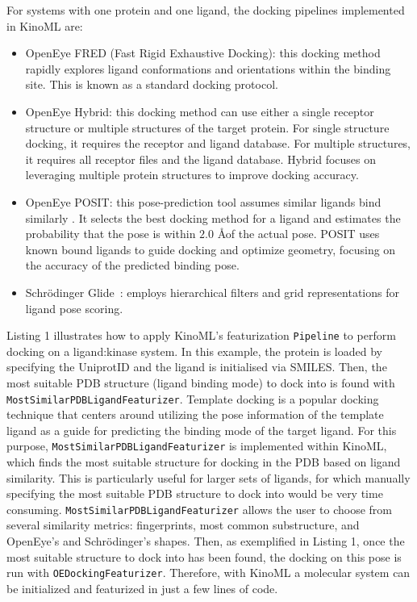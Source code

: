 \documentclass[9pt,lessons]{livecoms}
\begin{document}
For systems with one protein and one ligand, the docking pipelines implemented in KinoML are: 
\begin{itemize}
    \item OpenEye FRED (Fast Rigid Exhaustive Docking): this docking method rapidly explores ligand conformations and orientations within the binding site. This is known as a standard docking protocol.
    \item OpenEye Hybrid: this docking method can use either a single receptor structure or multiple structures of the target protein. For single structure docking, it requires the receptor and ligand database. For multiple structures, it requires all receptor files and the ligand database. Hybrid focuses on leveraging multiple protein structures to improve docking accuracy.
    \item OpenEye POSIT: this pose-prediction tool assumes similar ligands bind similarly \cite{posit}. It selects the best docking method for a ligand and estimates the probability that the pose is within $2.0$ \AA \space of the actual pose. POSIT uses known bound ligands to guide docking and optimize geometry, focusing on the accuracy of the predicted binding pose.
    \item Schrödinger Glide~\cite{friesner2006extra}: employs hierarchical filters and grid representations for ligand pose scoring.
\end{itemize}


Listing 1 illustrates how to apply KinoML's featurization \texttt{Pipeline} to perform docking on a ligand:kinase system. In this example, the protein is loaded by specifying the UniprotID and the ligand is initialised via SMILES. Then, the most suitable PDB structure (ligand binding mode) to dock into is found with \texttt{Most\-Similar\-PDB\-Ligand\-Featurizer}. Template docking is a popular docking technique that centers around utilizing the pose information of the template ligand as a guide for predicting the binding mode of the target ligand. For this purpose, \texttt{MostSimilarPDBLigandFeaturizer} is implemented within KinoML, which finds the most suitable structure for docking in the PDB based on ligand similarity. This is particularly useful for larger sets of ligands, for which manually specifying the most suitable PDB structure to dock into would be very time consuming. \texttt{MostSimilarPDBLigandFeaturizer} allows the user to choose from several similarity metrics: fingerprints, most common substructure, and OpenEye's and Schrödinger's shapes. Then, as exemplified in Listing 1, once the most suitable structure to dock into has been found, the docking on this pose is run with \texttt{OEDockingFeaturizer}. Therefore, with KinoML a molecular system can be initialized and featurized in just a few lines of code.
\end{document}
